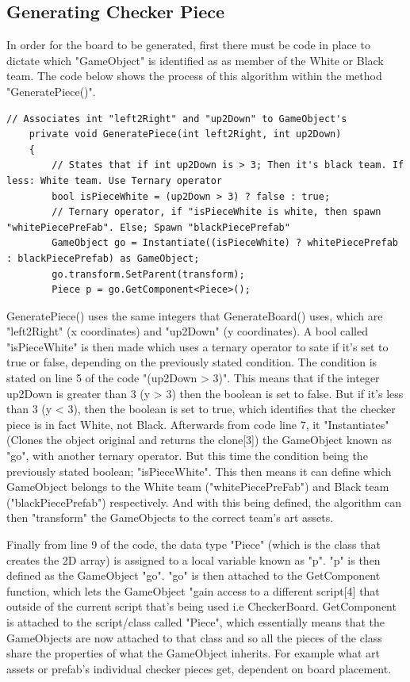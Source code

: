 \documentclass[10pt, a4paper]{article}
\begin{document}
	 \subsection{Generating Checker Piece}
	 In order for the board to be generated, first there must be code in place to dictate which "GameObject" is identified as as member of the White or Black team. The code below shows the process of this algorithm within the method "GeneratePiece()".
	 \\	 
	 \begin{lstlisting}[caption = GeneratePiece()]
	 // Associates int "left2Right" and "up2Down" to GameObject's
    private void GeneratePiece(int left2Right, int up2Down)
    {
        // States that if int up2Down is > 3; Then it's black team. If less: White team. Use Ternary operator
        bool isPieceWhite = (up2Down > 3) ? false : true;
        // Ternary operator, if "isPieceWhite is white, then spawn "whitePiecePreFab". Else; Spawn "blackPiecePrefab"
        GameObject go = Instantiate((isPieceWhite) ? whitePiecePrefab : blackPiecePrefab) as GameObject;
        go.transform.SetParent(transform);
        Piece p = go.GetComponent<Piece>();      
	 \end{lstlisting}
	 GeneratePiece() uses the same integers that GenerateBoard() uses, which are "left2Right" (x coordinates) and "up2Down" (y coordinates). A bool called "isPieceWhite" is then made which uses a ternary operator to sate if it's set to true or false, depending on the previously stated condition. The condition is stated on line 5 of the code "(up2Down > 3)". This means that if the integer up2Down is greater than 3 (y > 3) then the boolean is set to false. But if it's less than 3 (y < 3), then the boolean is set to true, which identifies that the checker piece is in fact White, not Black. Afterwards from code line 7, it "Instantiates" (Clones the object original and returns the clone[3]) the GameObject known as "go", with another ternary operator. But this time the condition being the previously stated boolean; "isPieceWhite". This then means it can define which GameObject belongs to the White team ("whitePiecePreFab") and Black team ("blackPiecePrefab") respectively. And with this being defined, the algorithm can then "transform" the GameObjects to the correct team's art assets.
	 
	 Finally from line 9 of the code, the data type "Piece" (which is the class that creates the 2D array) is assigned to a local variable known as "p". "p" is then defined as the GameObject "go". "go" is then attached to the GetComponent function, which lets the GameObject "gain access to a different script[4] that outside of the current script that's being used i.e CheckerBoard. GetComponent is attached to the script/class called "Piece", which essentially means that the GameObjects are now attached to that class and so all the pieces of the class share the properties of what the GameObject inherits. For example what art assets or prefab's individual checker pieces get, dependent on board placement.
	 
\end{document}
